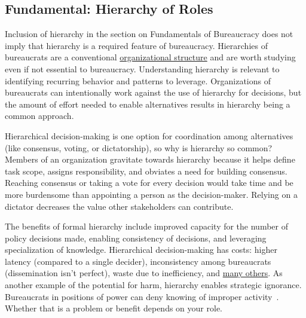 \subsection*{Fundamental: Hierarchy of Roles\label{sec:hierarchy-of-roles}}

Inclusion of hierarchy in the section on Fundamentals of Bureaucracy does not imply that hierarchy is a required feature of bureaucracy. Hierarchies of bureaucrats are a conventional \href{https://en.wikipedia.org/wiki/Organizational_structure}{organizational structure} 
\iftoggle{WPinmargin}{\marginpar{$>$Wikipedia: Organizational structure}}{}
and are worth studying even if not essential to bureaucracy. Understanding hierarchy is relevant to identifying recurring behavior and patterns to leverage.
Organizations of bureaucrats can intentionally work against the use of hierarchy for decisions, but the amount of effort needed to enable alternatives results in hierarchy being a common approach.


Hierarchical decision-making is one option for coordination among alternatives (like consensus, voting, or dictatorship), so why is hierarchy so common? Members of an organization gravitate towards hierarchy because it helps define task scope, assigns responsibility, and obviates a need for building consensus. Reaching consensus or taking a vote for every decision would take time and be more burdensome than appointing a person as the decision-maker. Relying on a dictator decreases the value other stakeholders can contribute. 


The benefits of formal hierarchy include improved capacity for the number of policy decisions made, enabling consistency of decisions, and leveraging specialization of knowledge. 
Hierarchical decision-making has costs: higher latency (compared to a single decider), inconsistency among bureaucrats (dissemination isn't perfect), waste due to inefficiency, and 
\hyperref[sec:unavoidable-hazards]{many others}.
As another example of the potential for harm, hierarchy enables strategic ignorance. Bureaucrats in positions of power can deny knowing of improper activity~\cite{2019_McGoey, 2012_McGoey}.  Whether that is a problem or benefit depends on your role. 

